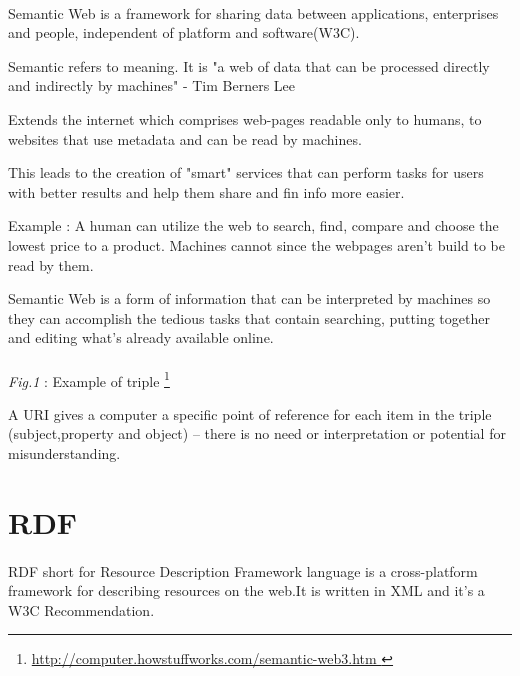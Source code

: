 \documentclass[a4paper,11pt]{report}
\begin{document}
\paragraph{}Semantic Web is a framework for sharing data between applications, enterprises and people, independent of platform and software(W3C).

Semantic refers to  {\color{red}meaning}. It is "a web of data that can be processed directly and indirectly by machines" - Tim Berners Lee

Extends the internet which comprises web-pages readable only to humans, to websites that use metadata and can be read by machines.

This leads to the creation of "smart" services that can perform tasks for users with better results and help them share and fin info more easier.

Example : A human can utilize the web to search, find, compare and choose the lowest price to a product. Machines cannot since the webpages aren't build to be read by them.

Semantic Web is a form of information that can be interpreted by machines so they can accomplish the tedious tasks that contain searching, putting together and editing what's already available online.

\paragraph{}

\begin{center}
\textit{Fig.1} : Example of triple \footnote{\url {http://computer.howstuffworks.com/semantic-web3.htm
}}
\end{center}
 A URI gives a computer a specific point of reference for each item in the triple (subject,property and object) -- there is no need or interpretation or potential for misunderstanding.

\section{RDF}
\paragraph{}
RDF short for Resource Description Framework language is a  {\color{red}cross-platform framework} for describing resources on the web.It is written in XML and it's a W3C Recommendation.
\end{document}
